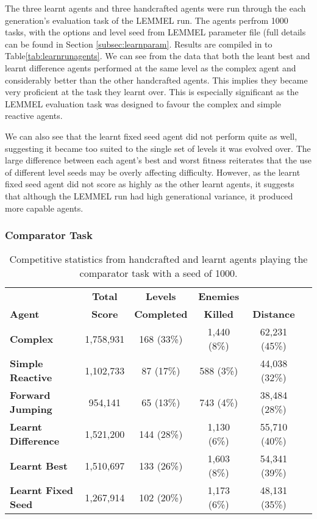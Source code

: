 The three learnt agents and three handcrafted agents were run through the each generation's evaluation task of the LEMMEL run. The agents perfrom 1000 tasks, with the options and level seed from LEMMEL parameter file (full details can be found in Section \ref{subsec:learnparam}. Results are compiled in to Table\ref{tab:learnrunagents}. We can see from the data that both the leant best and learnt difference agents performed at the same level as the complex agent and considerably better than the other handcrafted agents. This implies they became very proficient at the task they learnt over. This is especially significant as the LEMMEL evaluation task was designed to favour the complex and simple reactive agents.

We can also see that the learnt fixed seed agent did not perform quite as well, suggesting it became too suited to the single set of levels it was evolved over. The large difference between each agent's best and worst fitness reiterates that the use of different level seeds may be overly affecting difficulty. However, as the learnt fixed seed agent did not score as highly as the other learnt agents, it suggests that although the LEMMEL run had high generational variance, it produced more capable agents.

\subsubsection{Comparator Task}

\begin{table}
  \begin{adjustwidth}{-0cm}{-0cm}
  \begin{center} \small
    \begin{tabular}{ | l | c | c | c | c | c |}
    \hline
    & \textbf{Total} & \textbf{Levels} & \textbf{Enemies} & \Tstrut \\
    \textbf{Agent} & \textbf{Score} & \textbf{Completed} & \textbf{Killed} & \textbf{Distance} \Bstrut \\ \thickhline
    \textbf{Complex} & 1,758,931 & 168 (33\%) & 1,440 (8\%) & 62,231 (45\%) \\ \hline
    \textbf{Simple Reactive} & 1,102,733 & 87 (17\%) & 588 (3\%) & 44,038 (32\%) \\ \hline
    \textbf{Forward Jumping} & 954,141 & 65 (13\%) & 743 (4\%) & 38,484 (28\%) \\ \thickhline
    \textbf{Learnt Difference} & 1,521,200 & 144 (28\%) & 1,130 (6\%) & 55,710 (40\%) \\ \hline
    \textbf{Learnt Best} & 1,510,697 & 133 (26\%) & 1,603 (8\%) & 54,341 (39\%) \\ \hline
    \textbf{Learnt Fixed Seed} & 1,267,914 & 102 (20\%) & 1,173 (6\%) & 48,131 (35\%) \\ \hline
    \end{tabular}
  \end{center}
  \end{adjustwidth}
  \caption{\small Competitive statistics from handcrafted and learnt agents playing the comparator task with a seed of 1000.}
  \label{tab:learnagentcomp}
\end{table}

